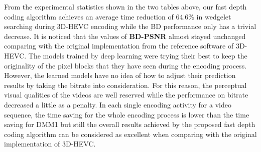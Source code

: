 From the experimental statistics shown in the two tables above,
our fast depth coding algorithm achieves
an average time reduction of 64.6\% in wedgelet searching 
during 3D-HEVC encoding
while the BD performance only has a trivial decrease.
It is noticed that the values of \textbf{BD-PSNR} almost stayed
unchanged comparing
with the original implementation from the reference software
of 3D-HEVC\@.
The models trained by deep learning
were trying their best to keep the originality of the
pixel blocks that they have seen during the encoding process.
However, the learned models have no idea of how to
adjust their prediction results by taking the bitrate
into consideration.
For this reason, the perceptual visual qualities of the videos
are well reserved while the performance on bitrate
decreased a little as 
a penalty.
In each single encoding activity for a video sequence, 
the time saving for the whole encoding process is lower than 
the time saving for DMM1 but still the overall results
achieved by the proposed fast depth coding algorithm
can be considered as excellent when
comparing with the original implementation of 3D-HEVC\@.
